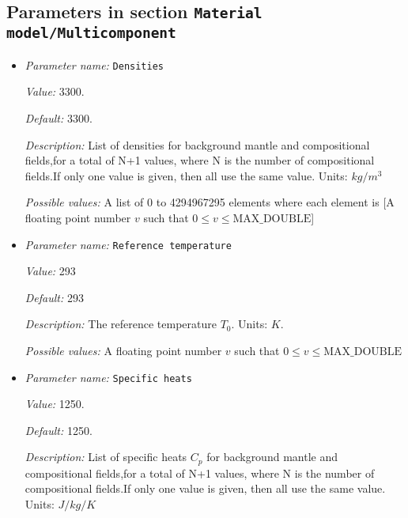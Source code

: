 \subsection{Parameters in section \tt Material model/Multicomponent}
\label{parameters:Material_20model/Multicomponent}

\begin{itemize}
\item {\it Parameter name:} {\tt Densities}
\label{parameters:Material model/Multicomponent/Densities}


{\it Value:} 3300.


{\it Default:} 3300.


{\it Description:} List of densities for background mantle and compositional fields,for a total of N+1 values, where N is the number of compositional fields.If only one value is given, then all use the same value.  Units: $kg / m^3$


{\it Possible values:} A list of 0 to 4294967295 elements where each element is [A floating point number $v$ such that $0 \leq v \leq \text{MAX\_DOUBLE}$]
\item {\it Parameter name:} {\tt Reference temperature}
\label{parameters:Material model/Multicomponent/Reference temperature}


{\it Value:} 293


{\it Default:} 293


{\it Description:} The reference temperature $T_0$. Units: $K$.


{\it Possible values:} A floating point number $v$ such that $0 \leq v \leq \text{MAX\_DOUBLE}$
\item {\it Parameter name:} {\tt Specific heats}
\label{parameters:Material model/Multicomponent/Specific heats}


{\it Value:} 1250.


{\it Default:} 1250.


{\it Description:} List of specific heats $C_p$ for background mantle and compositional fields,for a total of N+1 values, where N is the number of compositional fields.If only one value is given, then all use the same value. Units: $J /kg /K$



\end{itemize}
